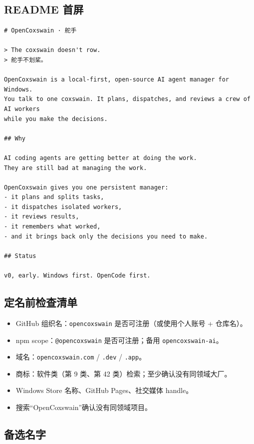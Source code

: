 \documentclass[UTF8,11pt,a4paper,fontset=windows]{ctexart}
\let\ocsubsection\subsection
\renewcommand{\subsection}{\Needspace{5\baselineskip}\ocsubsection}
\newcommand{\code}[1]{\texttt{#1}}
\begin{document}
\subsection{README 首屏}

\begin{lstlisting}[caption={README 首屏文案建议},label={lst:readme},basicstyle=\ttfamily\scriptsize,aboveskip=2pt,belowskip=2pt]
# OpenCoxswain · 舵手

> The coxswain doesn't row.
> 舵手不划桨。

OpenCoxswain is a local-first, open-source AI agent manager for Windows.
You talk to one coxswain. It plans, dispatches, and reviews a crew of AI workers
while you make the decisions.

## Why

AI coding agents are getting better at doing the work.
They are still bad at managing the work.

OpenCoxswain gives you one persistent manager:
- it plans and splits tasks,
- it dispatches isolated workers,
- it reviews results,
- it remembers what worked,
- and it brings back only the decisions you need to make.

## Status

v0, early. Windows first. OpenCode first.
\end{lstlisting}

\subsection{定名前检查清单}

\begin{itemize}
  \item GitHub 组织名：\code{opencoxswain} 是否可注册（或使用个人账号 + 仓库名）。
  \item npm scope：\code{@opencoxswain} 是否可注册；备用 \code{opencoxswain-ai}。
  \item 域名：\code{opencoxswain.com} / \code{.dev} / \code{.app}。
  \item 商标：软件类（第 9 类、第 42 类）检索；至少确认没有同领域大厂。
  \item Windows Store 名称、GitHub Pages、社交媒体 handle。
  \item 搜索“OpenCoxswain”确认没有同领域项目。
\end{itemize}

\subsection{备选名字}
\end{document}
